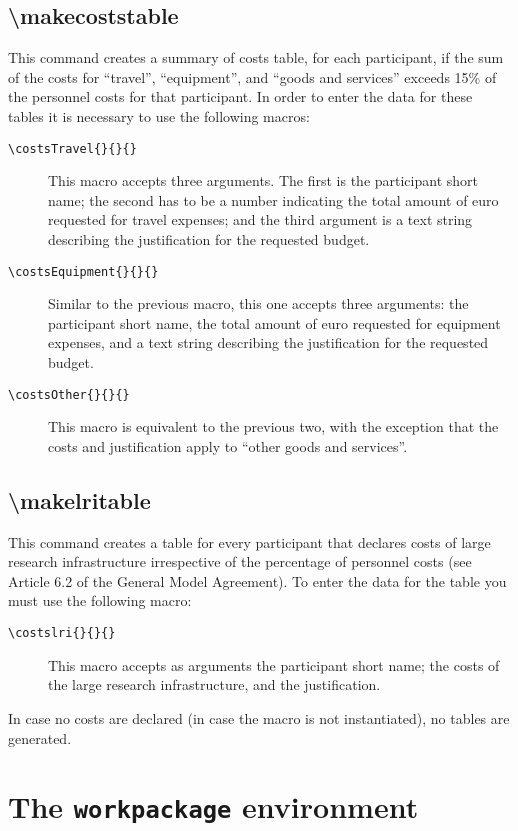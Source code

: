 \documentclass[pdftext]{article}
\begin{document}
\subsection{\textbackslash makecoststable}
This command creates a summary of costs table, for each participant, if the sum of the costs for ``travel'', ``equipment'', and ``goods and services'' exceeds 15\% of the personnel costs for that participant. In order to enter the data for these tables it is necessary to use the following macros:
\begin{description}
\item[\texttt{\textbackslash costsTravel\{\}\{\}\{\}}] This macro accepts three arguments. The first is the participant short name; the second has to be a number indicating the total amount of euro requested for travel expenses; and the third argument is a text string describing the justification for the requested budget.
\item[\texttt{\textbackslash costsEquipment\{\}\{\}\{\}}] Similar to the previous macro, this one accepts three arguments: the participant short name, the total amount of euro requested for equipment expenses, and  a text string describing the justification for the requested budget.
\item[\texttt{\textbackslash costsOther\{\}\{\}\{\}}] This macro is equivalent to the previous two, with the exception that the costs and justification apply to ``other goods and services''.
\end{description}


\subsection{\textbackslash makelritable}
This command creates a table for every participant that declares costs of large research infrastructure irrespective of the percentage of personnel costs (see Article 6.2 of the General Model Agreement). To enter the data for the table you must use the following macro:
\begin{description}
\item[\texttt{\textbackslash costslri\{\}\{\}\{\}}] This macro accepts as arguments the participant short name; the costs of the large research infrastructure, and the justification.
\end{description}
In case no costs are declared (in case the macro is not instantiated), no tables are generated.

\section{The \texttt{workpackage} environment}
\label{sec:wp-envir}
\end{document}
